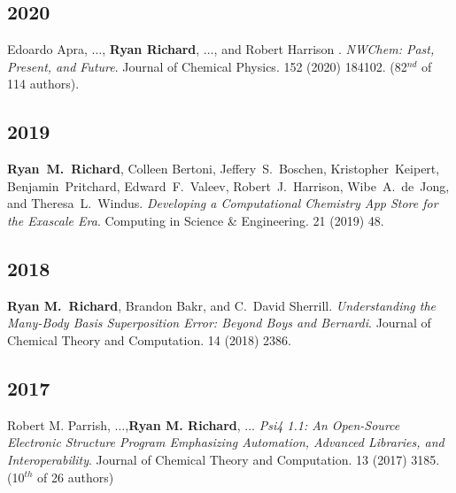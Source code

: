 \documentclass[11pt,a4paper,sans]{moderncv}
\begin{document}
\begin{etaremune}
	\subsection{2020}
	\item{Edoardo Apra, $\ldots$, \textbf{Ryan Richard}, $\ldots$, and Robert 
	      Harrison . \textit{NWChem: Past, Present, and Future}. Journal of 
		  Chemical Physics. 152 (2020) 184102. (82$^{nd}$ of 114 authors).}

	\subsection{2019}
	\item{\textbf{Ryan~M.~Richard}, Colleen Bertoni, Jeffery~S.~Boschen, 
	       Kristopher~Keipert, Benjamin~Pritchard, Edward~F.~Valeev, 
		   Robert~J.~Harrison, Wibe~A.~de~Jong, and Theresa~L.~Windus. 
		   \textit{Developing a Computational Chemistry App Store for the 
		   Exascale Era}. Computing in Science \& Engineering. 21 (2019) 48.}

	\subsection{2018}
	\item{\textbf{Ryan M.~Richard}, Brandon Bakr, and C.~David Sherrill. 
	      \emph{Understanding the Many-Body Basis Superposition Error: Beyond 
		  Boys and Bernardi}. Journal of Chemical Theory and Computation. 14 
		  (2018) 2386.}

	\subsection{2017}
	\item{Robert M. Parrish, $\ldots$,\textbf{Ryan M. Richard}, $\ldots$ 
	      \emph{Psi4 1.1: An Open-Source Electronic Structure Program 
		  Emphasizing Automation, Advanced Libraries, and Interoperability}.  
		  Journal of Chemical Theory and Computation. 13 (2017) 3185. 
		  (10$^{th}$ of 26 authors)}


\end{etaremune}
\end{document}
